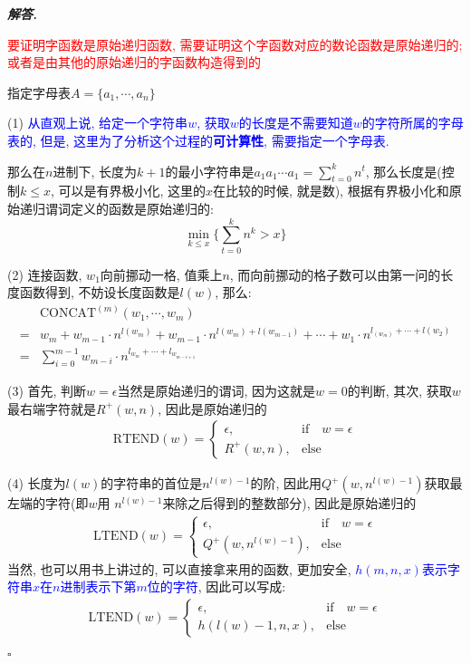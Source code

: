 \documentclass[10pt, a4paper, oneside]{ctexart}
\newenvironment{solution}{%
  \par\noindent\textbf{\textit{解答. }}\ignorespaces
}{%
  \hfill\ensuremath{\square}\par %
}
\begin{document}
\begin{solution}
\textcolor{red}{要证明字函数是原始递归函数, 需要证明这个字函数对应的数论函数是原始递归的; 或者是由其他的原始递归的字函数构造得到的}

指定字母表$A=\{a_1,\cdots,a_n\}$

(1) \textcolor{blue}{从直观上说, 给定一个字符串$w$, 获取$w$的长度是不需要知道$w$的字符所属的字母表的, 但是, 这里为了分析这个过程的\textbf{可计算性}, 需要指定一个字母表.}

那么在$n$进制下, 长度为$k+1$的最小字符串是$a_1a_1\cdots a_1=\sum_{t=0}^k n^{t}$, 那么长度是(控制$k\leq x$, 可以是有界极小化, 这里的$x$在比较的时候, 就是数), 根据有界极小化和原始递归谓词定义的函数是原始递归的:
$$\min_{ k\leq x } \{\sum_{t=0}^k n^k > x \} $$

(2) 连接函数, $w_1$向前挪动一格, 值乘上$n$, 而向前挪动的格子数可以由第一问的长度函数得到, 不妨设长度函数是$l(w)$, 那么: 
\begin{align*}
    &\text{CONCAT}^{(m)}(w_1,\cdots,w_m)\\
    =& w_m + w_{m-1}\cdot n^{l(w_m)}+ w_{m-1}\cdot n^{l(w_m)+l(w_{m-1})}+\cdots+w_1\cdot n^{l_(w_m)+\cdots+l(w_2)}\\
    =& \sum_{i=0}^{m-1} w_{m-i}\cdot n^{l_{w_m}+\cdots+l_{w_{m-i+1}}}
\end{align*}

(3) 首先, 判断$w=\epsilon$当然是原始递归的谓词, 因为这就是$w=0$的判断, 其次, 获取$w$最右端字符就是$R^{+}(w,n)$, 因此是原始递归的 
\begin{align*}
    \text{RTEND}(w)=\begin{cases}
        \epsilon, &\text{if} \quad w=\epsilon\\
        R^+(w,n), &\text{else} 
    \end{cases}
\end{align*}

(4) 长度为$l(w)$的字符串的首位是$n^{l(w)-1}$的阶, 因此用$Q^+(w,n^{l(w)-1})$获取最左端的字符(即$w$用 $n^{l(w)-1}$来除之后得到的整数部分), 因此是原始递归的 
\begin{align*}
    \text{LTEND}(w)=\begin{cases}
        \epsilon, &\text{if} \quad w=\epsilon\\
        Q^+(w,n^{l(w)-1}), &\text{else} 
    \end{cases}
\end{align*}
当然, 也可以用书上讲过的, 可以直接拿来用的函数, 更加安全, \textcolor{blue}{$h(m,n,x)$表示字符串$x$在$n$进制表示下第$m$位的字符}, 因此可以写成:
\begin{align*}
    \text{LTEND}(w)=\begin{cases}
        \epsilon, &\text{if} \quad w=\epsilon\\
        h(l(w)-1,n,x), &\text{else} 
    \end{cases}
\end{align*}


\end{solution}
\end{document}
